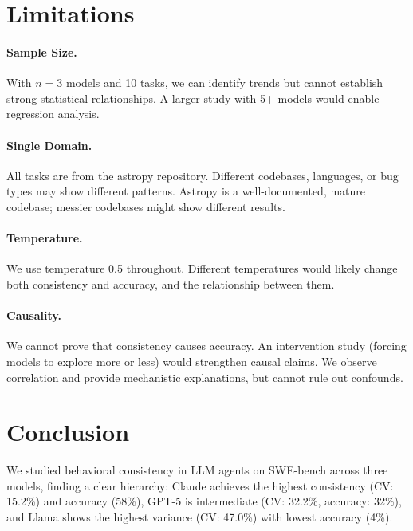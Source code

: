 \documentclass{article}
\begin{document}
\section{Limitations}
\label{sec:limitations}

\paragraph{Sample Size.} With $n=3$ models and 10 tasks, we can identify trends but cannot establish strong statistical relationships. A larger study with 5+ models would enable regression analysis.

\paragraph{Single Domain.} All tasks are from the astropy repository. Different codebases, languages, or bug types may show different patterns. Astropy is a well-documented, mature codebase; messier codebases might show different results.

\paragraph{Temperature.} We use temperature 0.5 throughout. Different temperatures would likely change both consistency and accuracy, and the relationship between them.

\paragraph{Causality.} We cannot prove that consistency causes accuracy. An intervention study (forcing models to explore more or less) would strengthen causal claims. We observe correlation and provide mechanistic explanations, but cannot rule out confounds.

\section{Conclusion}
\label{sec:conclusion}

We studied behavioral consistency in LLM agents on SWE-bench across three models, finding a clear hierarchy: Claude achieves the highest consistency (CV: 15.2\%) and accuracy (58\%), GPT-5 is intermediate (CV: 32.2\%, accuracy: 32\%), and Llama shows the highest variance (CV: 47.0\%) with lowest accuracy (4\%).
\end{document}
